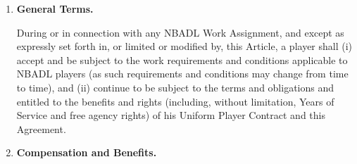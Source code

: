 \documentclass[
]{book}
\begin{document}
\begin{enumerate}
\def\labelenumi{(\alph{enumi})}
\item
  \textbf{General Terms.}

  During or in connection with any NBADL Work Assignment, and except as expressly set forth in, or limited or modified by, this Article, a player shall (i) accept and be subject to the work requirements and conditions applicable to NBADL players (as such requirements and conditions may change from time to time), and (ii) continue to be subject to the terms and obligations and entitled to the benefits and rights (including, without limitation, Years of Service and free agency rights) of his Uniform Player Contract and this Agreement.
\item
  \textbf{Compensation and Benefits.}


\end{enumerate}
\end{document}
